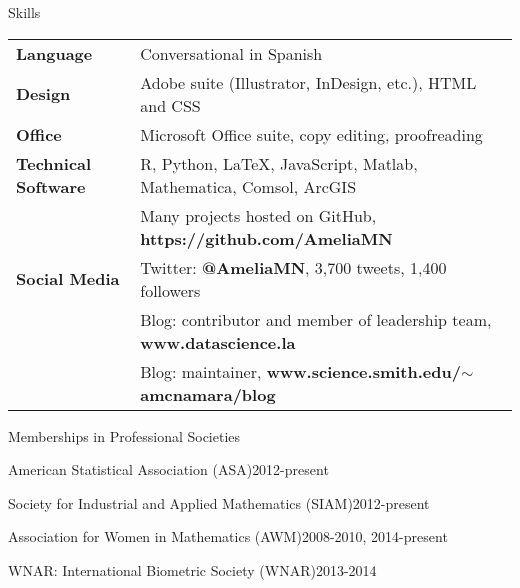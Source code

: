 \documentclass{resume} %
\begin{document}
\clearpage

\begin{rSection}{Skills}

\begin{tabular}{ @{} >{\bfseries}l @{\hspace{6ex}} l }
Language & Conversational in Spanish \\
Design & Adobe suite (Illustrator, InDesign, etc.), %
HTML and CSS \\
Office & Microsoft Office suite, copy editing, proofreading %
 \\
Technical Software & R, Python, LaTeX, JavaScript, Matlab, Mathematica, Comsol, ArcGIS  \\
& Many projects hosted on GitHub, \textbf{https://github.com/AmeliaMN} \\
Social Media & Twitter: \textbf{@AmeliaMN}, 3,700 tweets, 1,400 followers \\
 & Blog: contributor and member of leadership team, \textbf{www.datascience.la} \\
 & Blog: maintainer, \textbf{www.science.smith.edu/$\sim$amcnamara/blog}
\end{tabular}
\end{rSection}



\begin{rSection}{Memberships in Professional Societies}
\begin{esSubsection}{American Statistical Association }{(ASA)}{2012-present}{}{}
\end{esSubsection}

\begin{esSubsection}{Society for Industrial and Applied Mathematics }{(SIAM)}{2012-present}{}{}
\end{esSubsection}

\begin{esSubsection}{Association for Women in Mathematics }{(AWM)}{2008-2010, 2014-present}{}{}
\end{esSubsection}

\begin{esSubsection}{WNAR: International Biometric Society }{(WNAR)}{2013-2014}{}{}
\end{esSubsection}


\end{rSection}
\end{document}
